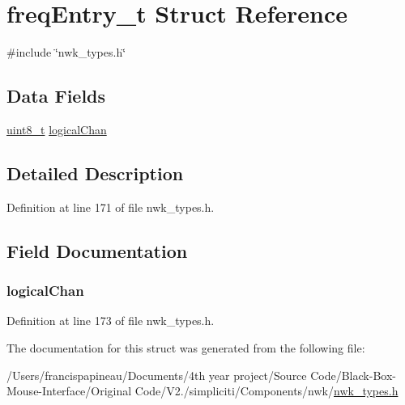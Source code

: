 \hypertarget{structfreqEntry__t}{\section{freq\-Entry\-\_\-t \-Struct \-Reference}
\label{structfreqEntry__t}
}


{\ttfamily \#include \char`\"{}nwk\-\_\-types.\-h\char`\"{}}

\subsection*{\-Data \-Fields}
\begin{DoxyCompactItemize}
\item 
\hyperlink{bsp__msp430__defs_8h_aba7bc1797add20fe3efdf37ced1182c5}{uint8\-\_\-t} \hyperlink{structfreqEntry__t_afb2c0884696beb10e8d2813ad6765cbb}{logical\-Chan}
\end{DoxyCompactItemize}


\subsection{\-Detailed \-Description}


\-Definition at line 171 of file nwk\-\_\-types.\-h.



\subsection{\-Field \-Documentation}
\hypertarget{structfreqEntry__t_afb2c0884696beb10e8d2813ad6765cbb}{
\subsubsection[{logical\-Chan}]{ {\bf logical\-Chan}}}\label{structfreqEntry__t_afb2c0884696beb10e8d2813ad6765cbb}


\-Definition at line 173 of file nwk\-\_\-types.\-h.



\-The documentation for this struct was generated from the following file\-:\begin{DoxyCompactItemize}
\item 
/\-Users/francispapineau/\-Documents/4th year project/\-Source Code/\-Black-\/\-Box-\/\-Mouse-\/\-Interface/\-Original Code/\-V2./simpliciti/\-Components/nwk/\hyperlink{nwk__types_8h}{nwk\-\_\-types.\-h}\end{DoxyCompactItemize}
